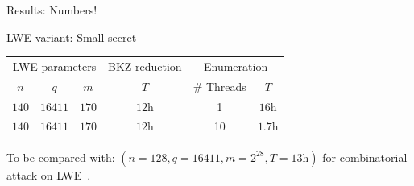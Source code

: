 \begin{frame}{Results: Numbers!}
{\begin{block}{LWE variant: Small secret}
\begin{table}[t!]
\begin{tabular}{ccc|c|cc}
                    \multicolumn{3}{c|}{LWE-parameters} & {BKZ-reduction}  & \multicolumn{2}{c}{Enumeration} \\
                    $n$   & $q$     & $m$     & $T$             & \# Threads & $T$      \\ \midrule
                    $140$ & $16411$     & $170$     & $12$h             & 1 & $16$h  \\
                    $140$ & $16411$     & $170$     & $12$h             & 10 & $1.7$h  \\
                \end{tabular}
            \end{table}
        \end{block}
        \vfill{}
        To be compared with: $(n=128, q=16411, m =2^{28}, T=13\text{h} )$ for combinatorial attack on LWE~\cite{BKW}.
    }
\end{frame}
